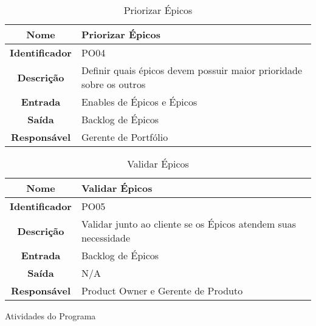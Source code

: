 {             \begin{table}[H]
                \centering
                \caption{Priorizar Épicos}
                \begin{tabular}{c|p{10cm}}
                    \hline
                    \textbf{Nome}            & Priorizar Épicos\\
                    \hline
                    \textbf{Identificador} & PO04\\ 
                    \hline
                    \textbf{Descrição}   & Definir quais épicos devem possuir maior prioridade sobre os outros\\ 
                    \hline
                    \textbf{Entrada}           & Enables de Épicos e Épicos\\
                    \hline
                    \textbf{Saída}            &  Backlog de Épicos\\
                    \hline
                    \textbf{Responsável}            &  Gerente de Portfólio\\
                    \hline                    
                \end{tabular}
            \end{table}

            \begin{table}[H]
                \centering
                \caption{Validar Épicos}
                \begin{tabular}{c|p{10cm}}
                    \hline
                    \textbf{Nome}            & Validar Épicos\\
                    \hline
                    \textbf{Identificador} & PO05\\ 
                    \hline
                    \textbf{Descrição}   & Validar junto ao cliente se os Épicos atendem suas necessidade\\ 
                    \hline
                    \textbf{Entrada}           & Backlog de Épicos\\
                    \hline
                    \textbf{Saída}            &  N/A\\
                    \hline
                    \textbf{Responsável}            & Product Owner e  Gerente de Produto\\
                    \hline                    
                \end{tabular}
            \end{table}

    \large{Atividades do Programa\\}

}
